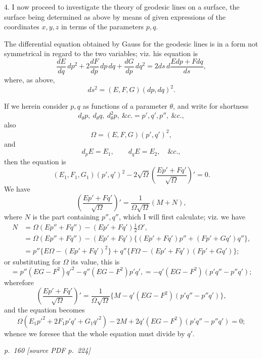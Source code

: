 \documentclass[11pt,a4paper]{article}
\newcommand{\sourcepage}[2]{%
  \bigskip
  \noindent\textit{p.~#1 [source PDF p.~#2]}%
  \par\smallskip
}
\newcommand{\qform}[2]{(#1)(#2)^2}
\begin{document}
4. I now proceed to investigate the theory of geodesic lines on a surface, the surface
being determined as above by means of given expressions of the coordinates \(x,y,z\)
in terms of the parameters \(p,q\).

The differential equation obtained by Gauss for the geodesic lines is in a form not
symmetrical in regard to the two variables; viz. his equation is
\[
\frac{dE}{dq}\,dp^2+2\frac{dF}{dp}\,dp\,dq+\frac{dG}{dp}\,dq^2
=2ds\,d\frac{Edp+Fdq}{ds},
\]
where, as above,
\[
ds^2=\qform{E,F,G}{dp,dq}.
\]

If we herein consider \(p,q\) as functions of a parameter \(\theta\), and write for
shortness
\[
d_\theta p,\ d_\theta q,\ d_\theta^2p,\ \&c.=p',q',p'',\ \&c.,
\]
also
\[
\Omega=\qform{E,F,G}{p',q'},
\]
and
\[
d_pE=E_1,\qquad d_qE=E_2,\quad \&c.,
\]
then the equation is
\[
\qform{E_1,F_1,G_1}{p',q'}-2\sqrt{\Omega}\left(\frac{Ep'+Fq'}{\sqrt{\Omega}}\right)'=0.
\]
We have
\[
\left(\frac{Ep'+Fq'}{\sqrt{\Omega}}\right)'
=\frac{1}{\Omega\sqrt{\Omega}}(M+N),
\]
where \(N\) is the part containing \(p'',q''\), which I will first calculate; viz. we have
\[
\begin{aligned}
N&=\Omega(Ep''+Fq'')-(Ep'+Fq')\tfrac12\Omega',\\
&=\Omega(Ep''+Fq'')-(Ep'+Fq')\{(Ep'+Fq')p''+(Fp'+Gq')q''\},\\
&=p''\{E\Omega-(Ep'+Fq')^2\}
  +q''\{F\Omega-(Ep'+Fq')(Fp'+Gq')\};
\end{aligned}
\]
or substituting for \(\Omega\) its value, this is
\[
=p''(EG-F^2)q'^2-q''(EG-F^2)p'q',
=-q'(EG-F^2)(p'q''-p''q');
\]
wherefore
\[
\left(\frac{Ep'+Fq'}{\sqrt{\Omega}}\right)'
=\frac{1}{\Omega\sqrt{\Omega}}\{M-q'(EG-F^2)(p'q''-p''q')\},
\]
and the equation becomes
\[
\Omega(E_1p'^2+2F_1p'q'+G_1q'^2)-2M
  +2q'(EG-F^2)(p'q''-p''q')=0;
\]
whence we foresee that the whole equation must divide by \(q'\).

\sourcepage{160}{224}
\end{document}
